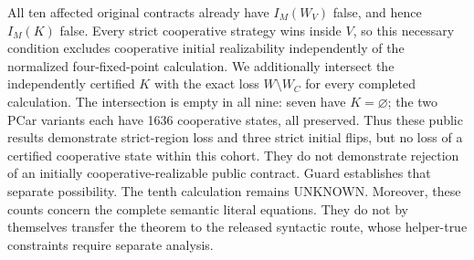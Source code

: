 All ten affected original contracts already have $I_M(W_V)$ false,
and hence $I_M(K)$ false. Every strict cooperative strategy wins
inside $V$, so this necessary condition excludes cooperative initial
realizability independently of the normalized four-fixed-point calculation.
We additionally intersect the independently certified $K$ with the
exact loss $W\setminus W_C$ for every completed calculation.
The intersection is empty in all nine: seven have $K=\varnothing$;
the two PCar variants each have 1636 cooperative states, all preserved.
Thus these public results demonstrate strict-region loss and three
strict initial flips, but no loss of a certified cooperative state
within this cohort.
They do not demonstrate rejection of an initially cooperative-realizable
public contract. Guard establishes that separate possibility.
The tenth calculation remains UNKNOWN.
Moreover, these counts concern the complete semantic literal equations.
They do not by themselves transfer the theorem to the released syntactic
route, whose helper-true constraints require separate analysis.

